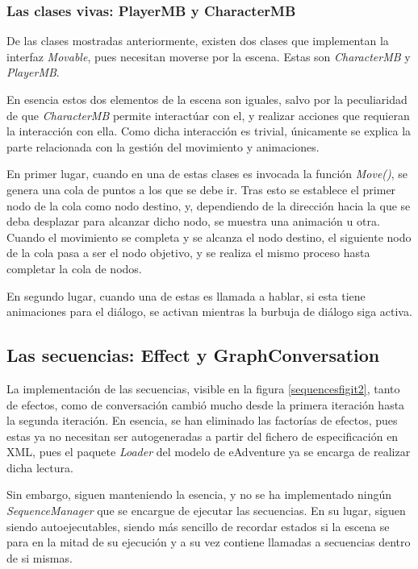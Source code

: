 \subsubsection{Las clases vivas: PlayerMB y CharacterMB}
\label{playerit2}

De las clases mostradas anteriormente, existen dos clases que implementan la interfaz \textit{Movable}, pues necesitan moverse por la escena. Estas son \textit{CharacterMB} y \textit{PlayerMB}.

En esencia estos dos elementos de la escena son iguales, salvo por la peculiaridad de que \textit{CharacterMB} permite interactúar con el, y realizar acciones que requieran la interacción con ella. Como dicha interacción es trivial, únicamente se explica la parte relacionada con la gestión del movimiento y animaciones.

En primer lugar, cuando en una de estas clases es invocada la función \textit{Move()}, se genera una cola de puntos a los que se debe ir. Tras esto se establece el primer nodo de la cola como nodo destino, y, dependiendo de la dirección hacia la que se deba desplazar para alcanzar dicho nodo, se muestra una animación u otra. Cuando el movimiento se completa y se alcanza el nodo destino, el siguiente nodo de la cola pasa a ser el nodo objetivo, y se realiza el mismo proceso hasta completar la cola de nodos. 

En segundo lugar, cuando una de estas es llamada a hablar, si esta tiene animaciones para el diálogo, se activan mientras la burbuja de diálogo siga activa.

\subsection{Las secuencias: Effect y GraphConversation}
\label{sequencesit2}

La implementación de las secuencias, visible en la figura \ref{sequencesfigit2}, tanto de efectos, como de conversación cambió mucho desde la primera iteración hasta la segunda iteración. En esencia, se han eliminado las factorías de efectos, pues estas ya no necesitan ser autogeneradas a partir del fichero de especificación en XML, pues el paquete \textit{Loader} del modelo de eAdventure ya se encarga de realizar dicha lectura.

Sin embargo, siguen manteniendo la esencia, y no se ha implementado ningún \textit{SequenceManager} que se encargue de ejecutar las secuencias. En su lugar, siguen siendo autoejecutables, siendo más sencillo de recordar estados si la escena se para en la mitad de su ejecución y a su vez contiene llamadas a secuencias dentro de si mismas.

